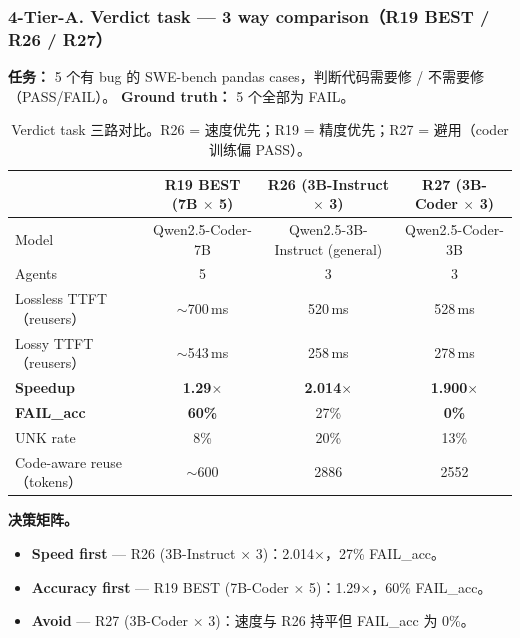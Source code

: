 \documentclass[11pt,a4paper]{article}
\begin{document}
\subsubsection*{4-Tier-A. Verdict task --- 3 way comparison（R19 BEST / R26 / R27）}

\textbf{任务：} 5 个有 bug 的 SWE-bench pandas cases，判断代码需要修 / 不需要修（PASS/FAIL）。
\textbf{Ground truth：} 5 个全部为 FAIL。

\begin{table}[h]
\centering\small
\begin{tabular}{@{}lccc@{}}
\toprule
 & \textbf{R19 BEST (7B $\times$ 5)} & \textbf{R26 (3B-Instruct $\times$ 3)} & \textbf{R27 (3B-Coder $\times$ 3)} \\
\midrule
Model                                  & Qwen2.5-Coder-7B    & Qwen2.5-3B-Instruct (general) & Qwen2.5-Coder-3B \\
Agents                                 & 5                   & 3                              & 3 \\
Lossless TTFT（reusers）                & $\sim$700\,ms       & 520\,ms                        & 528\,ms \\
Lossy TTFT（reusers）                   & $\sim$543\,ms       & 258\,ms                        & 278\,ms \\
\textbf{Speedup}                       & \textbf{1.29$\times$} & \textbf{2.014$\times$}         & \textbf{1.900$\times$} \\
\textbf{FAIL\_acc}                      & \textbf{60\%}       & 27\%                           & \textbf{0\%} \\
UNK rate                               & 8\%                 & 20\%                           & 13\% \\
Code-aware reuse（tokens）              & $\sim$600           & 2886                           & 2552 \\
\bottomrule
\end{tabular}
\caption{Verdict task 三路对比。R26 = 速度优先；R19 = 精度优先；R27 = 避用（coder 训练偏 PASS）。}
\end{table}

\textbf{决策矩阵。}
\begin{itemize}
  \item \textbf{Speed first} --- R26 (3B-Instruct $\times$ 3)：2.014$\times$，27\% FAIL\_acc。
  \item \textbf{Accuracy first} --- R19 BEST (7B-Coder $\times$ 5)：1.29$\times$，60\% FAIL\_acc。
  \item \textbf{Avoid} --- R27 (3B-Coder $\times$ 3)：速度与 R26 持平但 FAIL\_acc 为 0\%。
\end{itemize}
\end{document}
